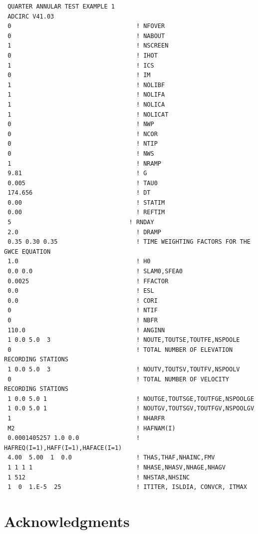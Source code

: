 \documentclass[11pt,titlepage]{article}
\begin{document}
{\small
\begin{verbatim}
 QUARTER ANNULAR TEST EXAMPLE 1      
 ADCIRC V41.03                       
 0                                   ! NFOVER 
 0                                   ! NABOUT 
 1                                   ! NSCREEN 
 0                                   ! IHOT 
 1                                   ! ICS
 0                                   ! IM 
 1                                   ! NOLIBF 
 1                                   ! NOLIFA
 1                                   ! NOLICA 
 1                                   ! NOLICAT 
 0                                   ! NWP 
 0                                   ! NCOR
 0                                   ! NTIP
 0                                   ! NWS
 1                                   ! NRAMP
 9.81                                ! G 
 0.005                               ! TAU0 
 174.656                             ! DT 
 0.00                                ! STATIM
 0.00                                ! REFTIM 
 5                                 ! RNDAY 
 2.0                                 ! DRAMP
 0.35 0.30 0.35                      ! TIME WEIGHTING FACTORS FOR THE GWCE EQUATION
 1.0                                 ! H0 
 0.0 0.0                             ! SLAM0,SFEA0 
 0.0025                              ! FFACTOR 
 0.0                                 ! ESL
 0.0                                 ! CORI 
 0                                   ! NTIF 
 0                                   ! NBFR 
 110.0                               ! ANGINN 
 1 0.0 5.0  3                        ! NOUTE,TOUTSE,TOUTFE,NSPOOLE
 0                                   ! TOTAL NUMBER OF ELEVATION RECORDING STATIONS
 1 0.0 5.0  3                        ! NOUTV,TOUTSV,TOUTFV,NSPOOLV
 0                                   ! TOTAL NUMBER OF VELOCITY RECORDING STATIONS
 1 0.0 5.0 1                         ! NOUTGE,TOUTSGE,TOUTFGE,NSPOOLGE 
 1 0.0 5.0 1                         ! NOUTGV,TOUTSGV,TOUTFGV,NSPOOLGV
 1                                   ! NHARFR
 M2                                  ! HAFNAM(I)
 0.0001405257 1.0 0.0                ! HAFREQ(I=1),HAFF(I=1),HAFACE(I=1)
 4.00  5.00  1  0.0                  ! THAS,THAF,NHAINC,FMV 
 1 1 1 1                             ! NHASE,NHASV,NHAGE,NHAGV 
 1 512                               ! NHSTAR,NHSINC 
 1  0  1.E-5  25                     ! ITITER, ISLDIA, CONVCR, ITMAX
\end{verbatim}}

\newpage

\section{Acknowledgments}
\end{document}

